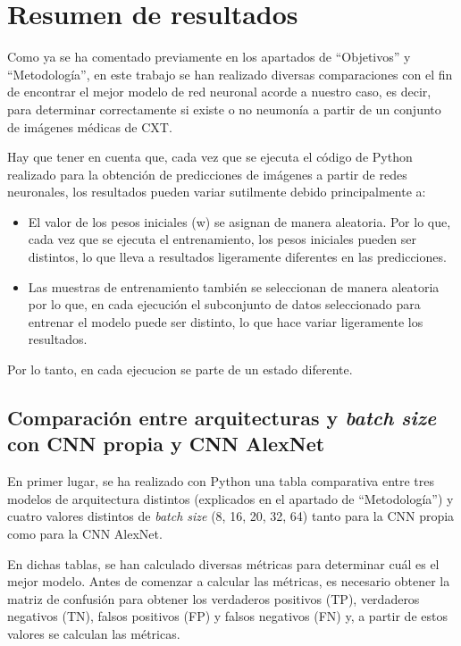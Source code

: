 
\section{Resumen de resultados}

Como ya se ha comentado previamente en los apartados de ``Objetivos'' y ``Metodología'', en este trabajo se han realizado diversas comparaciones con el fin de encontrar el mejor modelo de red neuronal acorde a nuestro caso, es decir, para determinar correctamente si existe o no neumonía a partir de un conjunto de imágenes médicas de CXT.

Hay que tener en cuenta que, cada vez que se ejecuta el código de Python realizado para la obtención de predicciones de imágenes a partir de redes neuronales, los resultados pueden variar sutilmente debido principalmente a:
\begin{itemize}
    \item El valor de los pesos iniciales (w) se asignan de manera aleatoria. Por lo que, cada vez que se ejecuta el entrenamiento, los pesos iniciales pueden ser distintos, lo que lleva a resultados ligeramente diferentes en las predicciones.
    \item Las muestras de entrenamiento también se seleccionan de manera aleatoria por lo que, en cada ejecución el subconjunto de datos seleccionado para entrenar el modelo puede ser distinto, lo que hace variar ligeramente los resultados.
\end{itemize}

Por lo tanto, en cada ejecucion se parte de un estado diferente.

\subsection{Comparación entre arquitecturas y \textit{batch size} con CNN propia y CNN AlexNet}

En primer lugar, se ha realizado con Python una tabla comparativa entre tres modelos de arquitectura distintos (explicados en el apartado de ``Metodología'') y cuatro valores distintos de \textit{batch size} (8, 16, 20, 32, 64) tanto para la CNN propia como para la CNN AlexNet.

En dichas tablas, se han calculado diversas métricas para determinar cuál es el mejor modelo. Antes de comenzar a calcular las métricas, es necesario obtener la matriz de confusión para obtener los verdaderos positivos (TP), verdaderos negativos (TN), falsos positivos (FP) y falsos negativos (FN) y, a partir de estos valores se calculan las métricas.

